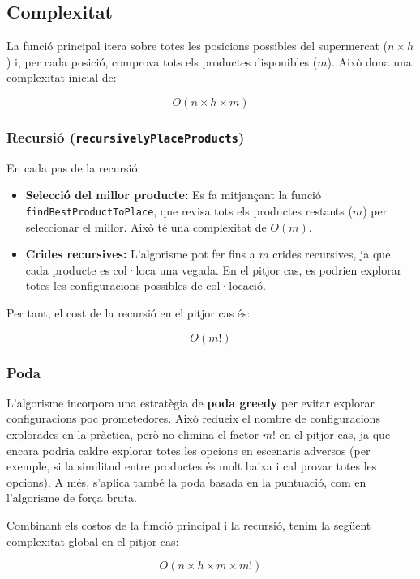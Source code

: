 \documentclass[a4paper,12pt]{report}
\begin{document}
\begin{itemize}
\subsection{Complexitat}

La funció principal itera sobre totes les posicions possibles del supermercat (\(n \times h\)) i, per cada posició, comprova tots els productes disponibles (\(m\)). Això dona una complexitat inicial de:

\[
O(n \times h \times m)
\]

\subsubsection{Recursió (\texttt{recursivelyPlaceProducts})}

En cada pas de la recursió:
\begin{itemize}
    \item \textbf{Selecció del millor producte:} Es fa mitjançant la funció \texttt{findBestProductToPlace}, que revisa tots els productes restants (\(m\)) per seleccionar el millor. Això té una complexitat de \(O(m)\).
    \item \textbf{Crides recursives:} L'algorisme pot fer fins a \(m\) crides recursives, ja que cada producte es col·loca una vegada. En el pitjor cas, es podrien explorar totes les configuracions possibles de col·locació.
\end{itemize}

Per tant, el cost de la recursió en el pitjor cas és:

\[
O(m!)
\]

\subsubsection{Poda}

L'algorisme incorpora una estratègia de \textbf{poda greedy} per evitar explorar configuracions poc prometedores. Això redueix el nombre de configuracions explorades en la pràctica, però no elimina el factor \(m!\) en el pitjor cas, ja que encara podria caldre explorar totes les opcions en escenaris adversos (per exemple, si la similitud entre productes és molt baixa i cal provar totes les opcions).
A més, s'aplica també la poda basada en la puntuació, com en l'algorisme de força bruta.

Combinant els costos de la funció principal i la recursió, tenim la següent complexitat global en el pitjor cas:

\[
O(n \times h \times m \times m!)
\]


\end{itemize}
\end{document}
